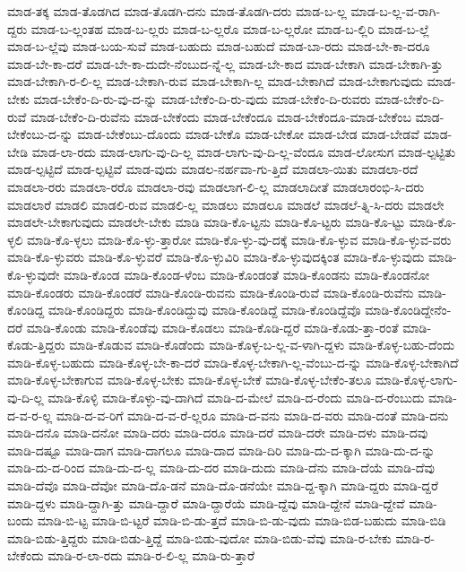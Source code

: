{ಮಾಡ-ತಕ್ಕ
ಮಾಡ-ತೊಡಗಿದ
ಮಾಡ-ತೊಡಗಿ-ದನು
ಮಾಡ-ತೊಡಗಿ-ದರು
ಮಾಡ-ಬ-ಲ್ಲ
ಮಾಡ-ಬ-ಲ್ಲ-ವ-ರಾಗಿ-ದ್ದರು
ಮಾಡ-ಬ-ಲ್ಲಂತಹ
ಮಾಡ-ಬ-ಲ್ಲರು
ಮಾಡ-ಬ-ಲ್ಲರೊ
ಮಾಡ-ಬ-ಲ್ಲರೋ
ಮಾಡ-ಬ-ಲ್ಲಿರಿ
ಮಾಡ-ಬ-ಲ್ಲೆ
ಮಾಡ-ಬ-ಲ್ಲೆವು
ಮಾಡ-ಬಯ-ಸುವೆ
ಮಾಡ-ಬಹುದು
ಮಾಡ-ಬಹುದೆ
ಮಾಡ-ಬಾ-ರದು
ಮಾಡ-ಬೇ-ಕಾ-ದರೂ
ಮಾಡ-ಬೇ-ಕಾ-ದರೆ
ಮಾಡ-ಬೇ-ಕಾ-ದುದೇ-ನೆಂಬುದ-ನ್ನೆ-ಲ್ಲ
ಮಾಡ-ಬೇ-ಕಾದ
ಮಾಡ-ಬೇಕಾಗಿ
ಮಾಡ-ಬೇಕಾಗಿ-ತ್ತು
ಮಾಡ-ಬೇಕಾಗಿ-ರ-ಲಿ-ಲ್ಲ
ಮಾಡ-ಬೇಕಾಗಿ-ರುವ
ಮಾಡ-ಬೇಕಾಗಿ-ಲ್ಲ
ಮಾಡ-ಬೇಕಾಗಿದೆ
ಮಾಡ-ಬೇಕಾಗುವುದು
ಮಾಡ-ಬೇಕು
ಮಾಡ-ಬೇಕೆಂ-ದಿ-ರು-ವು-ದ-ನ್ನು
ಮಾಡ-ಬೇಕೆಂ-ದಿ-ರು-ವುದು
ಮಾಡ-ಬೇಕೆಂ-ದಿ-ರುವರು
ಮಾಡ-ಬೇಕೆಂ-ದಿ-ರುವೆ
ಮಾಡ-ಬೇಕೆಂ-ದಿ-ರುವೆನು
ಮಾಡ-ಬೇಕೆಂದು
ಮಾಡ-ಬೇಕೆಂದೂ
ಮಾಡ-ಬೇಕೆಂದೂ-ಮಾಡ-ಬೇಕೆಂಬ
ಮಾಡ-ಬೇಕೆಂಬು-ದ-ನ್ನು
ಮಾಡ-ಬೇಕೆಂಬು-ದೊಂದು
ಮಾಡ-ಬೇಕೊ
ಮಾಡ-ಬೇಕೋ
ಮಾಡ-ಬೇಡ
ಮಾಡ-ಬೇಡವೆ
ಮಾಡ-ಬೇಡಿ
ಮಾಡ-ಲಾ-ರದು
ಮಾಡ-ಲಾಗು-ವು-ದಿ-ಲ್ಲ
ಮಾಡ-ಲಾಗು-ವು-ದಿ-ಲ್ಲ-ವೆಂದೂ
ಮಾಡ-ಲೋಸುಗ
ಮಾಡ-ಲ್ಪಟ್ಟಿತು
ಮಾಡ-ಲ್ಪಟ್ಟಿದೆ
ಮಾಡ-ಲ್ಪಟ್ಟಿವೆ
ಮಾಡ-ವುದು
ಮಾಡಲ-ನರ್ಹವಾ-ಗು-ತ್ತಿದೆ
ಮಾಡಲಾ-ಯಿತು
ಮಾಡಲಾ-ರದೆ
ಮಾಡಲಾ-ರರು
ಮಾಡಲಾ-ರರೊ
ಮಾಡಲಾ-ರವು
ಮಾಡಲಾಗ-ಲಿ-ಲ್ಲ
ಮಾಡಲಾದೀತೆ
ಮಾಡಲಾರಂಭಿ-ಸಿ-ದರು
ಮಾಡಲಾರೆ
ಮಾಡಲಿ
ಮಾಡಲಿ-ರುವ
ಮಾಡಲಿ-ಲ್ಲ
ಮಾಡಲು
ಮಾಡಲೂ
ಮಾಡಲೆ
ಮಾಡಲೆ-ತ್ನಿ-ಸಿ-ದರು
ಮಾಡಲೇ
ಮಾಡಲೇ-ಬೇಕಾಗುವುದು
ಮಾಡಲೇ-ಬೇಕು
ಮಾಡಿ
ಮಾಡಿ-ಕೊ-ಟ್ಟನು
ಮಾಡಿ-ಕೊ-ಟ್ಟರು
ಮಾಡಿ-ಕೊ-ಟ್ಟು
ಮಾಡಿ-ಕೊ-ಳ್ಳಲಿ
ಮಾಡಿ-ಕೊ-ಳ್ಳಲು
ಮಾಡಿ-ಕೊ-ಳ್ಳು-ತ್ತಾರೋ
ಮಾಡಿ-ಕೊ-ಳ್ಳು-ವು-ದಕ್ಕೆ
ಮಾಡಿ-ಕೊ-ಳ್ಳುವ
ಮಾಡಿ-ಕೊ-ಳ್ಳುವ-ವರು
ಮಾಡಿ-ಕೊ-ಳ್ಳುವರು
ಮಾಡಿ-ಕೊ-ಳ್ಳುವರೆ
ಮಾಡಿ-ಕೊ-ಳ್ಳುವಿರಿ
ಮಾಡಿ-ಕೊ-ಳ್ಳುವುದಕ್ಕಿಂತ
ಮಾಡಿ-ಕೊ-ಳ್ಳುವುದು
ಮಾಡಿ-ಕೊ-ಳ್ಳುವುದೇ
ಮಾಡಿ-ಕೊಂಡ
ಮಾಡಿ-ಕೊಂಡ-ಳೆಂಬ
ಮಾಡಿ-ಕೊಂಡಂತೆ
ಮಾಡಿ-ಕೊಂಡನು
ಮಾಡಿ-ಕೊಂಡನೋ
ಮಾಡಿ-ಕೊಂಡರು
ಮಾಡಿ-ಕೊಂಡರೆ
ಮಾಡಿ-ಕೊಂಡಿ-ರುವನು
ಮಾಡಿ-ಕೊಂಡಿ-ರುವೆ
ಮಾಡಿ-ಕೊಂಡಿ-ರುವೆನು
ಮಾಡಿ-ಕೊಂಡಿದ್ದ
ಮಾಡಿ-ಕೊಂಡಿದ್ದರು
ಮಾಡಿ-ಕೊಂಡಿದ್ದುವು
ಮಾಡಿ-ಕೊಂಡಿದ್ದೆ
ಮಾಡಿ-ಕೊಂಡಿದ್ದೆವೊ
ಮಾಡಿ-ಕೊಂಡಿದ್ದೇನೆಂ-ದರೆ
ಮಾಡಿ-ಕೊಂಡು
ಮಾಡಿ-ಕೊಂಡೆವು
ಮಾಡಿ-ಕೊಡಲು
ಮಾಡಿ-ಕೊಡಿ-ದ್ದರೆ
ಮಾಡಿ-ಕೊಡು-ತ್ತಾ-ರಂತೆ
ಮಾಡಿ-ಕೊಡು-ತ್ತಿದ್ದರು
ಮಾಡಿ-ಕೊಡುವ
ಮಾಡಿ-ಕೊಡೆಂದು
ಮಾಡಿ-ಕೊಳ್ಳ-ಬ-ಲ್ಲ-ವ-ಳಾಗಿ-ದ್ದಳು
ಮಾಡಿ-ಕೊಳ್ಳ-ಬಹು-ದೆಂದು
ಮಾಡಿ-ಕೊಳ್ಳ-ಬಹುದು
ಮಾಡಿ-ಕೊಳ್ಳ-ಬೇ-ಕಾ-ದರೆ
ಮಾಡಿ-ಕೊಳ್ಳ-ಬೇಕಾಗಿ-ಲ್ಲ-ವೆಂಬು-ದ-ನ್ನು
ಮಾಡಿ-ಕೊಳ್ಳ-ಬೇಕಾಗಿದೆ
ಮಾಡಿ-ಕೊಳ್ಳ-ಬೇಕಾಗುವ
ಮಾಡಿ-ಕೊಳ್ಳ-ಬೇಕು
ಮಾಡಿ-ಕೊಳ್ಳ-ಬೇಕೆ
ಮಾಡಿ-ಕೊಳ್ಳ-ಬೇಕೆಂ-ತಲೂ
ಮಾಡಿ-ಕೊಳ್ಳ-ಲಾಗು-ವು-ದಿ-ಲ್ಲ
ಮಾಡಿ-ಕೊಳ್ಳಿ
ಮಾಡಿ-ಕೊಳ್ಳು-ವು-ದಾಗಿದೆ
ಮಾಡಿ-ದ-ಮೇಲೆ
ಮಾಡಿ-ದ-ರೆಂದು
ಮಾಡಿ-ದ-ರೆಂಬುದು
ಮಾಡಿ-ದ-ವ-ರ-ಲ್ಲ
ಮಾಡಿ-ದ-ವ-ರಿಗೆ
ಮಾಡಿ-ದ-ವ-ರೆ-ಲ್ಲರೂ
ಮಾಡಿ-ದ-ವನು
ಮಾಡಿ-ದ-ವರು
ಮಾಡಿ-ದಂತೆ
ಮಾಡಿ-ದನು
ಮಾಡಿ-ದನೊ
ಮಾಡಿ-ದನೋ
ಮಾಡಿ-ದರು
ಮಾಡಿ-ದರೂ
ಮಾಡಿ-ದರೆ
ಮಾಡಿ-ದರೇ
ಮಾಡಿ-ದಳು
ಮಾಡಿ-ದವು
ಮಾಡಿ-ದಷ್ಟೂ
ಮಾಡಿ-ದಾಗ
ಮಾಡಿ-ದಾಗಲೂ
ಮಾಡಿ-ದಾದ
ಮಾಡಿ-ದಿರಿ
ಮಾಡಿ-ದು-ದ-ಕ್ಕಾಗಿ
ಮಾಡಿ-ದು-ದ-ನ್ನು
ಮಾಡಿ-ದು-ದ-ರಿಂದ
ಮಾಡಿ-ದು-ದ-ಲ್ಲ
ಮಾಡಿ-ದು-ದರ
ಮಾಡಿ-ದುದು
ಮಾಡಿ-ದೆನು
ಮಾಡಿ-ದೆಯೆ
ಮಾಡಿ-ದೆವು
ಮಾಡಿ-ದೆವೊ
ಮಾಡಿ-ದೆವೋ
ಮಾಡಿ-ದೊ-ಡನೆ
ಮಾಡಿ-ದೊ-ಡನೆಯೇ
ಮಾಡಿ-ದ್ದ-ಕ್ಕಾಗಿ
ಮಾಡಿ-ದ್ದರು
ಮಾಡಿ-ದ್ದರೆ
ಮಾಡಿ-ದ್ದಳು
ಮಾಡಿ-ದ್ದಾಗಿ-ತ್ತು
ಮಾಡಿ-ದ್ದಾರೆ
ಮಾಡಿ-ದ್ದಾರೆಯೆ
ಮಾಡಿ-ದ್ದೆವು
ಮಾಡಿ-ದ್ದೇನೆ
ಮಾಡಿ-ದ್ದೇವೆ
ಮಾಡಿ-ಬಂದು
ಮಾಡಿ-ಬಿ-ಟ್ಟ
ಮಾಡಿ-ಬಿ-ಟ್ಟರೆ
ಮಾಡಿ-ಬಿ-ಡು-ತ್ತದೆ
ಮಾಡಿ-ಬಿ-ಡು-ವುದು
ಮಾಡಿ-ಬಿಡ-ಬಹುದು
ಮಾಡಿ-ಬಿಡಿ
ಮಾಡಿ-ಬಿಡು-ತ್ತಿದ್ದರು
ಮಾಡಿ-ಬಿಡು-ತ್ತಿದ್ದೆ
ಮಾಡಿ-ಬಿಡು-ವುದೋ
ಮಾಡಿ-ಬಿಡು-ವೆವು
ಮಾಡಿ-ರ-ಬೇಕು
ಮಾಡಿ-ರ-ಬೇಕೆಂದು
ಮಾಡಿ-ರ-ಲಾ-ರದು
ಮಾಡಿ-ರ-ಲಿ-ಲ್ಲ
ಮಾಡಿ-ರು-ತ್ತಾರೆ
}
